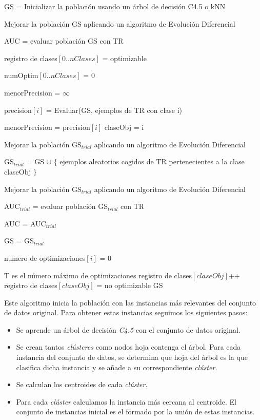 \begin{codigo}
\begin{algorithmic}[1]
\State \parbox[t]{305pt}{GS = Inicializar la población usando un árbol de decisión C4.5 o kNN\strut}
\State \parbox[t]{305pt}{Mejorar la población GS aplicando un algoritmo de Evolución Diferencial\strut}
\State \parbox[t]{305pt}{AUC = evaluar población GS con TR\strut}
\State \parbox[t]{305pt}{registro de clases$\left [ 0..nClases \right ]$ = optimizable\strut}
\State \parbox[t]{305pt}{numOptim$\left [ 0..nClases \right ]$ = 0\strut}
\State menorPrecision = $\infty$
\State \parbox[t]{305pt}{precision$\left [ i \right ]$ = Evaluar(GS, ejemplos de TR con clase i)\strut}
\State menorPrecision = precision$\left [ i \right ]$
\State claseObj = i
\EndIf
\EndIf
\EndFor
{}
\State \parbox[t]{295pt}{Mejorar la población GS$_{trial}$ aplicando un algoritmo de Evolución Diferencial\strut}
\Else
\State \parbox[t]{295pt}{GS$_{trial}$ = GS $\cup$ $\{$ ejemplos aleatorios cogidos de TR pertenecientes a la clase claseObj $\}$ \strut}
\State \parbox[t]{295pt}{Mejorar la población GS$_{trial}$ aplicando un algoritmo de Evolución Diferencial\strut}
\EndIf
\State \parbox[t]{295pt}{AUC$_{trial}$ = evaluar población GS$_{trial}$ con TR\strut}
\State \parbox[t]{295pt}{AUC = AUC$_{trial}$\strut}
\State \parbox[t]{295pt}{GS = GS$_{trial}$\strut}
\State \parbox[t]{295pt}{numero de optimizaciones$\left [ i \right ]$ = 0\strut}
\Else
{}
\State \Comment T es el número máximo de optimizaciones
\State registro de clases$\left [ claseObj \right ]$++
\Else
\State registro de clases$\left [ claseObj \right ]$ = no optimizable
\EndIf
\EndIf
\EndWhile
\State \Return GS
\EndFunction 
\end{algorithmic}
\end{codigo}

Este algoritmo inicia la población con las instancias más relevantes del conjunto de datos original. Para obtener estas instancias seguimos los siguientes pasos:

\begin{itemize}
	\item Se aprende un árbol de decisión \textit{C4.5} con el conjunto de datos original.
	\item Se crean tantos \textit{clústeres} como nodos hoja contenga el árbol. Para cada instancia del conjunto de datos, se determina que hoja del árbol es la que clasifica dicha instancia y se añade a su correspondiente \textit{clúster}.
	\item Se calculan los centroides de cada \textit{clúster}.
	\item Para cada \textit{clúster} calculamos la instancia más cercana al centroide. El conjunto de instancias inicial es el formado por la unión de estas instancias.
\end{itemize}

